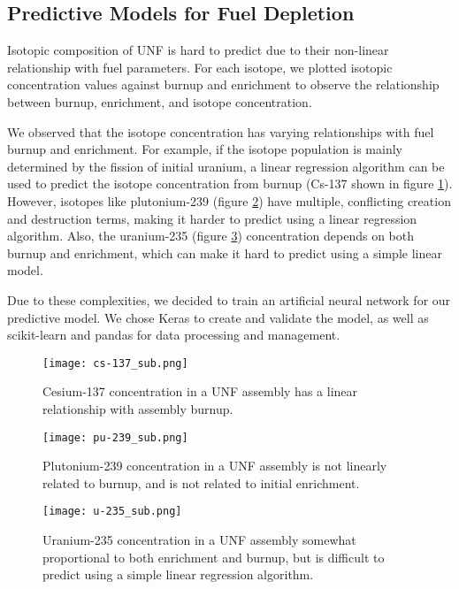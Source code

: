\subsection{Predictive Models for Fuel Depletion}

Isotopic composition of \gls{UNF} is hard to predict due to their
non-linear relationship with fuel parameters. For each
isotope, we plotted isotopic concentration values against
burnup and enrichment to observe the relationship between
burnup, enrichment, and isotope concentration.

We observed that the isotope concentration has varying
relationships with fuel burnup and enrichment.
For example, if the isotope population is mainly determined by
the fission of initial uranium, a linear regression algorithm
can be used to predict the isotope concentration from burnup
(Cs-137 shown in figure \ref{fig:cs_137}).
However, isotopes like plutonium-239 (figure \ref{fig:pu_239}) have multiple, conflicting creation
and destruction terms, making it harder to predict using a
linear regression algorithm. Also, the uranium-235 (figure \ref{fig:u_235}) concentration
depends on both burnup and enrichment, which can make it
hard to predict using a simple linear model.

Due to these complexities, we decided to train an artificial
neural network for our predictive model. We chose
Keras to create and validate the model, as well as scikit-learn
and pandas for data processing and management.

\begin{figure}
    \centering
    \texttt{[image: cs-137\_sub.png]}
    \caption{Cesium-137 concentration in a \gls{UNF} assembly
             has a linear relationship with assembly burnup.}
    \label{fig:cs_137}
\end{figure}

\begin{figure}
    \centering
    \texttt{[image: pu-239\_sub.png]}
    \caption{Plutonium-239 concentration in a \gls{UNF} assembly
             is not linearly related to burnup, and is
             not related to initial enrichment.}
    \label{fig:pu_239}
\end{figure}


\begin{figure}
    \centering
    \texttt{[image: u-235\_sub.png]}
    \caption{Uranium-235 concentration in a \gls{UNF} assembly
             somewhat proportional to both enrichment and
             burnup, but is difficult to predict using
             a simple linear regression algorithm.}
    \label{fig:u_235}
\end{figure}


